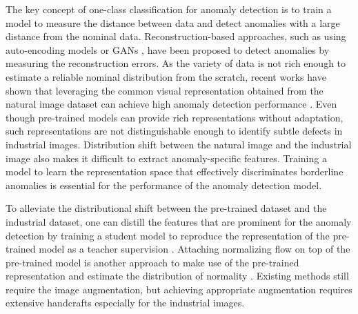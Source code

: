 \documentclass[10pt,onecolumn,letterpaper]{article}
\begin{document}
The key concept of one-class classification for anomaly detection is to train a model to measure the distance between data and detect anomalies with a large distance from the nominal data.
Reconstruction-based approaches, such as using auto-encoding models \cite{davletshina2020unsupervised,nguyen2019anomaly,sakurada2014anomaly} or GANs
\cite{pidhorskyi2018generative,sabokrou2018adversarially}, have been proposed to detect anomalies by measuring the reconstruction errors.
As the variety of data is not rich enough to estimate a reliable nominal distribution from the scratch, recent works have shown that leveraging the common visual representation obtained from the natural image dataset \cite{deng2009imagenet} can achieve high anomaly detection performance \cite{bergman2020deep,cohen2020sub}. 
Even though pre-trained models can provide rich representations without adaptation, such representations are not distinguishable enough to identify subtle defects in industrial images. Distribution shift between the natural image and the industrial image also makes it difficult to extract anomaly-specific features. 
Training a model to learn the representation space that effectively discriminates borderline anomalies is essential for the performance of the anomaly detection model.

To alleviate the distributional shift between the pre-trained dataset and the industrial dataset, one can distill the features that are prominent for the anomaly detection by training a student model to reproduce the representation of the pre-trained model as a teacher supervision \cite{bergmann2020uninformed}.
Attaching normalizing flow \cite{dinhdensity} on top of the pre-trained model is another approach to make use of the pre-trained representation and estimate the distribution of normality \cite{rudolph2021same}. Existing methods still require the image augmentation, but achieving appropriate augmentation requires extensive handcrafts especially for the industrial images.
\end{document}
